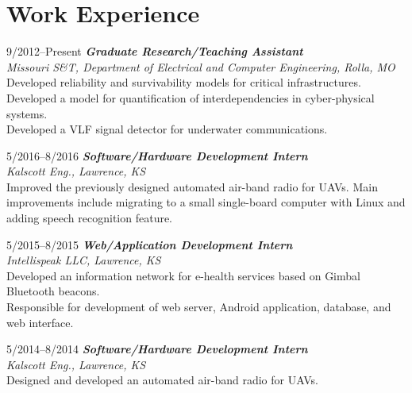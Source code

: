 \documentclass[10pt]{article}
\newlength{\Vspace}
\newlength{\Vspace}
\begin{document}
\section{Work Experience}

\begin{CV}

\item[9/2012--Present] \textbf{\textit{Graduate Research/Teaching Assistant}} \\
    \textit{Missouri S\&T, Department of Electrical and Computer Engineering, Rolla, MO}\vspace{\Vspace} \\
    Developed reliability and survivability models for critical infrastructures. \\
    Developed a model for quantification of interdependencies in cyber-physical systems. \\
    Developed a VLF signal detector for underwater communications.

\item[5/2016--8/2016] \textbf{\textit{Software/Hardware Development Intern}} \\
    \textit{Kalscott Eng., Lawrence, KS}\vspace{\Vspace} \\
    Improved the previously designed automated air-band radio for UAVs. Main improvements include migrating to a small single-board computer with Linux and adding speech recognition feature.

\item[5/2015--8/2015] \textbf{\textit{Web/Application Development Intern}} \\
    \textit{Intellispeak LLC, Lawrence, KS}\vspace{\Vspace} \\
    Developed an information network for e-health services based on Gimbal Bluetooth beacons. \\
    Responsible for development of web server, Android application, database, and web interface.

\item[5/2014--8/2014] \textbf{\textit{Software/Hardware Development Intern}} \\
    \textit{Kalscott Eng., Lawrence, KS}\vspace{\Vspace} \\
    Designed and developed an automated air-band radio for UAVs.


\end{CV}
\end{document}
